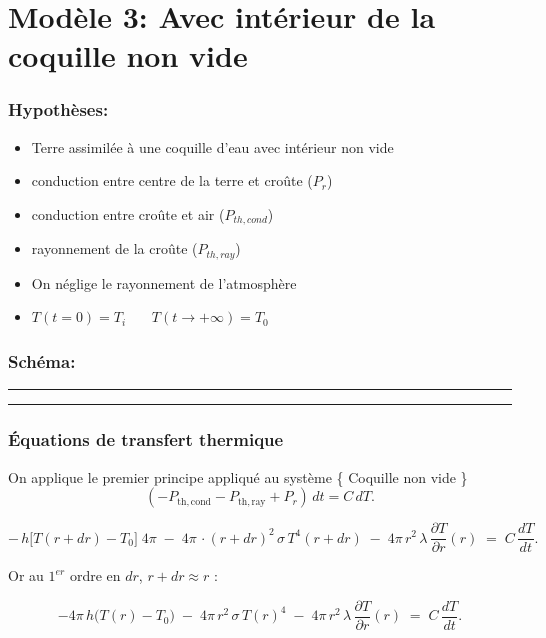 \documentclass[a4paper,12pt]{article}
\begin{document}
\section*{Modèle 3: Avec intérieur de la coquille non vide }
\subsubsection*{Hypothèses:}
\begin{itemize}
    \item Terre assimilée à une coquille d'eau avec intérieur non vide 
    \item  conduction entre centre de la terre et croûte (\(P_r\))
    \item  conduction entre croûte et air (\(P_{th,cond}\))
    \item  rayonnement de la croûte (\(P_{th,ray}\))
    \item On néglige le rayonnement de l'atmosphère
    \item $T(t=0) = T_i$ \ \ \
$T(t \to +\infty) = T_0$
    
    
    
\end{itemize}

\subsubsection*{Schéma:} 
\noindent\textcolor{gray}{\rule{\linewidth}{0.4pt}}

    
\begin{center}
  
\end{center}
\noindent\textcolor{gray}{\rule{\linewidth}{0.4pt}}

\subsubsection*{Équations de transfert thermique}

On applique le premier principe appliqué au système \{ Coquille non vide  \}
\[
(-P_{\mathrm{th,cond}} - P_{\mathrm{th,ray}} + P_r)\,dt = C\,dT.
\]

\[
-\,h\bigl[T(r+dr)-T_0\bigr]\;4\pi
\;-\;4\pi\,\cdot (r+dr)^2\,\sigma\,T^4(r+dr)
\;-\;4\pi\,r^2\,\lambda\,\frac{\partial T}{\partial r}(r)
\;=\;C\,\frac{dT}{dt}.
\]

\medskip

Or au \(1^{er}\) ordre en \(dr\), \(r+dr\approx r\) :

\[
-4\pi\,h\bigl(T(r)-T_0\bigr)
\;-\;4\pi\,r^2\,\sigma\,T(r)^4
\;-\;4\pi\,r^2\,\lambda\,\frac{\partial T}{\partial r}(r)
\;=\;C\,\frac{dT}{dt}.
\]
\end{document}
